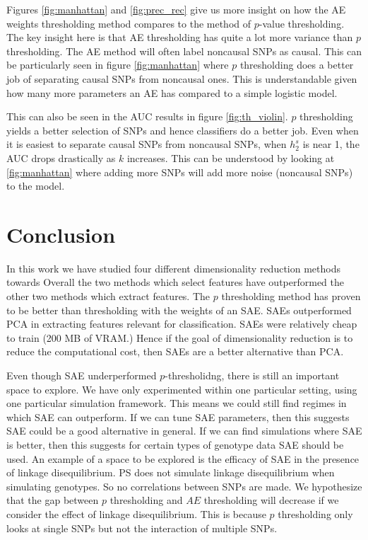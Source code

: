 \documentclass{article}
\begin{document}
Figures \ref{fig:manhattan} and \ref{fig:prec_rec} give us more insight on how the AE weights thresholding method compares to the method of $p$-value thresholding. The key insight here is that AE thresholding has quite a lot more variance than $p$ thresholding. The AE method will often label noncausal SNPs as causal. This can be particularly seen in figure \ref{fig:manhattan} where $p$ thresholding does a better job of separating causal SNPs from noncausal ones. This is understandable given how many more parameters an AE has compared to a simple logistic model. 

This can also be seen in the AUC results in figure \ref{fig:th_violin}. $p$ thresholding yields a better selection of SNPs and hence classifiers do a better job. Even when it is easiest to separate causal SNPs from noncausal SNPs, when $h_2^s$ is near 1, the AUC drops drastically as $k$ increases. This can be understood by looking at \ref{fig:manhattan} where adding more SNPs will add more noise (noncausal SNPs) to the model. 
\section{Conclusion}
In this work we have studied four different dimensionality reduction methods towards  Overall the two methods which select features have outperformed the other two methods which extract features. The $p$ thresholding method has proven to be better than thresholding with the weights of an SAE. SAEs outperformed PCA in extracting features relevant for classification. SAEs were relatively cheap to train (200 MB of VRAM.) Hence if the goal of dimensionality reduction is to reduce the computational cost, then SAEs are a better alternative than PCA.

Even though SAE underperformed $p$-thresholidng, there is still an important space to explore. We have only experimented within one particular setting, using one particular simulation framework. This means we could still find regimes in which SAE can outperform. If we can tune SAE parameters, then this suggests SAE could be a good alternative in general. If we can find simulations where SAE is better, then this suggests for certain types of genotype data SAE should be used. An example of a space to be explored is the efficacy of SAE in the presence of linkage disequilibrium. PS does not simulate linkage disequilibrium when simulating genotypes. So no correlations between SNPs are made. We hypothesize that the gap between $p$ thresholding and $AE$ thresholding will decrease if we consider the effect of linkage disequilibrium. This is because $p$ thresholding only looks at single SNPs but not the interaction of multiple SNPs.
\end{document}
